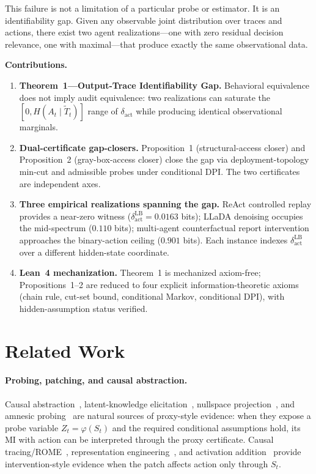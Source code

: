 \documentclass{article}
\begin{document}
This failure is not a limitation of a particular probe or estimator. It is an identifiability gap. Given any observable joint distribution over traces and actions, there exist two agent realizations---one with zero residual decision relevance, one with maximal---that produce exactly the same observational data.

\textbf{Contributions.}
\begin{enumerate}
  \item \textbf{Theorem~1---Output-Trace Identifiability Gap.} Behavioral equivalence does not imply audit equivalence: two realizations can saturate the $[0, H(A_t\mid\tilde T_t)]$ range of $\delta_\text{act}$ while producing identical observational marginals.
  \item \textbf{Dual-certificate gap-closers.} Proposition~1 (structural-access closer) and Proposition~2 (gray-box-access closer) close the gap via deployment-topology min-cut and admissible probes under conditional DPI. The two certificates are independent axes.
  \item \textbf{Three empirical realizations spanning the gap.} ReAct controlled replay provides a near-zero witness ($\delta_\text{act}^\text{LB}=0.0163$ bits); LLaDA denoising occupies the mid-spectrum ($0.110$ bits); multi-agent counterfactual report intervention approaches the binary-action ceiling ($0.901$ bits). Each instance indexes $\delta_\text{act}^\text{LB}$ over a different hidden-state coordinate.
  \item \textbf{Lean~4 mechanization.} Theorem~1 is mechanized axiom-free; Propositions~1--2 are reduced to four explicit information-theoretic axioms (chain rule, cut-set bound, conditional Markov, conditional DPI), with hidden-assumption status verified.
\end{enumerate}

\section{Related Work}
\label{sec:related}

\paragraph{Probing, patching, and causal abstraction.}
Causal abstraction~\citep{geiger2021causal}, latent-knowledge elicitation~\citep{burns2022discovering}, nullspace projection~\citep{ravfogel2020null}, and amnesic probing~\citep{elazar2021amnesic} are natural sources of proxy-style evidence: when they expose a probe variable $Z_t = \varphi(S_t)$ and the required conditional assumptions hold, its MI with action can be interpreted through the proxy certificate. Causal tracing/ROME~\citep{meng2022locating}, representation engineering~\citep{zou2023representation}, and activation addition~\citep{turner2023activation} provide intervention-style evidence when the patch affects action only through $S_t$.
\end{document}
